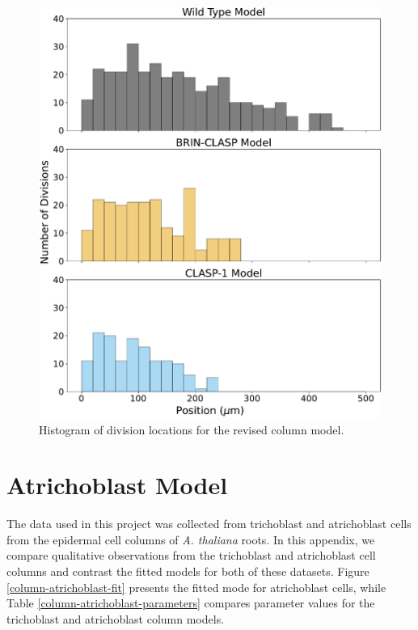 \documentclass[referee,pdflatex,sn-mathphys-num]{sn-jnl}
\begin{document}
\begin{appendices}
\begin{figure}
  \centering
  \includegraphics[width=\textwidth]{column-modified-histogram.pdf}
  \caption{Histogram of division locations for the revised column model.}
\end{figure}

\section{Atrichoblast Model}\label{secA4}

The data used in this project was collected from trichoblast and atrichoblast cells from the epidermal cell columns of \emph{A. thaliana} roots.
In this appendix, we compare qualitative observations from the trichoblast and atrichoblast cell columns and contrast the fitted models for both of these datasets.
Figure \ref{column-atrichoblast-fit} presents the fitted mode for atrichoblast cells, while Table \ref{column-atrichoblast-parameters} compares parameter values for the trichoblast and atrichoblast column models.


\end{appendices}
\end{document}
